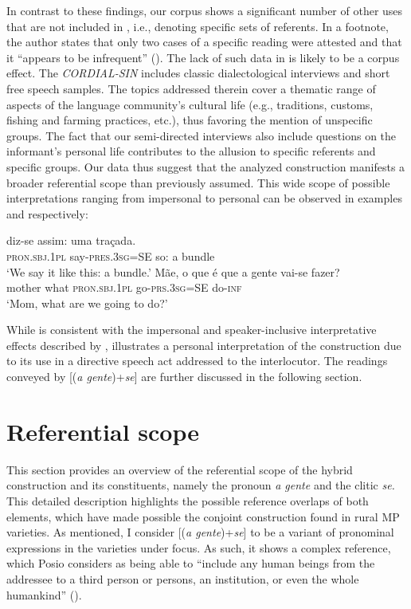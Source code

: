 \documentclass[output=paper]{langscibook}
\begin{document}
In contrast to these findings, our corpus shows a significant number of other uses that are not included in \citet{Martins2009}, i.e., denoting specific sets of referents. In a footnote, the author states that only two cases of a specific reading were attested and that it “appears to be infrequent” (\citealt[186, fn. 10]{Martins2009}). The lack of such data in \citet{Martins2009} is likely to be a corpus effect. The \textit{CORDIAL-SIN} includes classic dialectological interviews and short free speech samples. The topics addressed therein cover a thematic range of aspects of the language community's cultural life (e.g., traditions, customs, fishing and farming practices, etc.), thus favoring the mention of unspecific groups. The fact that our semi-directed interviews also include questions on the informant's personal life contributes to the allusion to specific referents and specific groups. Our data thus suggest that the analyzed construction manifests a broader referential scope than previously assumed. This wide scope of possible interpretations ranging from impersonal to personal can be observed in examples  and  respectively:

\ea\label{ex:henriques:14}
  diz-se assim: uma traçada.\\
         \textsc{pron.sbj.1pl} say-\textsc{pres.3sg}=SE so: a bundle\\
 \glt `We say it like this: a bundle.'
\ex\label{ex:henriques:15}
 \gll Mãe, {o que é que} {a gente} vai-se fazer? \\ 
         mother what \textsc{pron.sbj.1pl} go-\textsc{prs.3sg}=SE do-\textsc{inf}\\
 \glt `Mom, what are we going to do?'
\z 

While  is consistent with the impersonal and speaker-inclusive interpretative effects described by \citet[186–188]{Martins2009},  illustrates a personal interpretation of the construction due to its use in a directive speech act addressed to the interlocutor. The readings conveyed by [(\textit{a gente})+\textit{se}] are further discussed in the following section.

\section{Referential scope}\label{sec:henriques:4}

This section provides an overview of the referential scope of the hybrid construction and its constituents, namely the pronoun \textit{a gente} and the clitic \textit{se.} This detailed description highlights the possible reference overlaps of both elements, which have made possible the conjoint construction found in rural MP varieties. As mentioned, I consider [(\textit{a gente})+\textit{se}] to be a variant of pronominal  expressions in the varieties under focus. As such, it shows a complex reference, which Posio considers as being able to “include any human beings from the addressee to a third person or persons, an institution, or even the whole humankind” (\citeyear[342]{Posio2012}).
\end{document}
